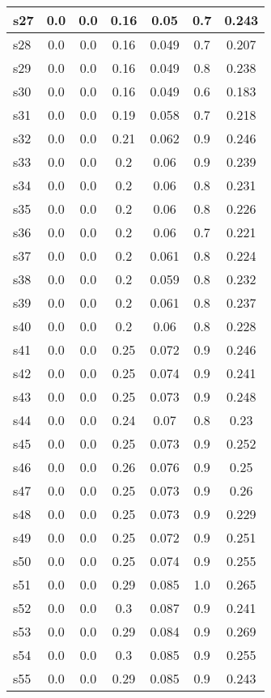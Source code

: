 \documentclass{article}
\begin{document}
\begin{tabular}{|l|c|c|c|c|c|c|}
\hline
s27 &0.0 & 0.0 & 0.16 & 0.05 & 0.7 & 0.243\\
\hline
s28 &0.0 & 0.0 & 0.16 & 0.049 & 0.7 & 0.207\\
\hline
s29 &0.0 & 0.0 & 0.16 & 0.049 & 0.8 & 0.238\\
\hline
s30 &0.0 & 0.0 & 0.16 & 0.049 & 0.6 & 0.183\\
\hline
s31 &0.0 & 0.0 & 0.19 & 0.058 & 0.7 & 0.218\\
\hline
s32 &0.0 & 0.0 & 0.21 & 0.062 & 0.9 & 0.246\\
\hline
s33 &0.0 & 0.0 & 0.2 & 0.06 & 0.9 & 0.239\\
\hline
s34 &0.0 & 0.0 & 0.2 & 0.06 & 0.8 & 0.231\\
\hline
s35 &0.0 & 0.0 & 0.2 & 0.06 & 0.8 & 0.226\\
\hline
s36 &0.0 & 0.0 & 0.2 & 0.06 & 0.7 & 0.221\\
\hline
s37 &0.0 & 0.0 & 0.2 & 0.061 & 0.8 & 0.224\\
\hline
s38 &0.0 & 0.0 & 0.2 & 0.059 & 0.8 & 0.232\\
\hline
s39 &0.0 & 0.0 & 0.2 & 0.061 & 0.8 & 0.237\\
\hline
s40 &0.0 & 0.0 & 0.2 & 0.06 & 0.8 & 0.228\\
\hline
s41 &0.0 & 0.0 & 0.25 & 0.072 & 0.9 & 0.246\\
\hline
s42 &0.0 & 0.0 & 0.25 & 0.074 & 0.9 & 0.241\\
\hline
s43 &0.0 & 0.0 & 0.25 & 0.073 & 0.9 & 0.248\\
\hline
s44 &0.0 & 0.0 & 0.24 & 0.07 & 0.8 & 0.23\\
\hline
s45 &0.0 & 0.0 & 0.25 & 0.073 & 0.9 & 0.252\\
\hline
s46 &0.0 & 0.0 & 0.26 & 0.076 & 0.9 & 0.25\\
\hline
s47 &0.0 & 0.0 & 0.25 & 0.073 & 0.9 & 0.26\\
\hline
s48 &0.0 & 0.0 & 0.25 & 0.073 & 0.9 & 0.229\\
\hline
s49 &0.0 & 0.0 & 0.25 & 0.072 & 0.9 & 0.251\\
\hline
s50 &0.0 & 0.0 & 0.25 & 0.074 & 0.9 & 0.255\\
\hline
s51 &0.0 & 0.0 & 0.29 & 0.085 & 1.0 & 0.265\\
\hline
s52 &0.0 & 0.0 & 0.3 & 0.087 & 0.9 & 0.241\\
\hline
s53 &0.0 & 0.0 & 0.29 & 0.084 & 0.9 & 0.269\\
\hline
s54 &0.0 & 0.0 & 0.3 & 0.085 & 0.9 & 0.255\\
\hline
s55 &0.0 & 0.0 & 0.29 & 0.085 & 0.9 & 0.243\\

\end{tabular}
\end{document}
